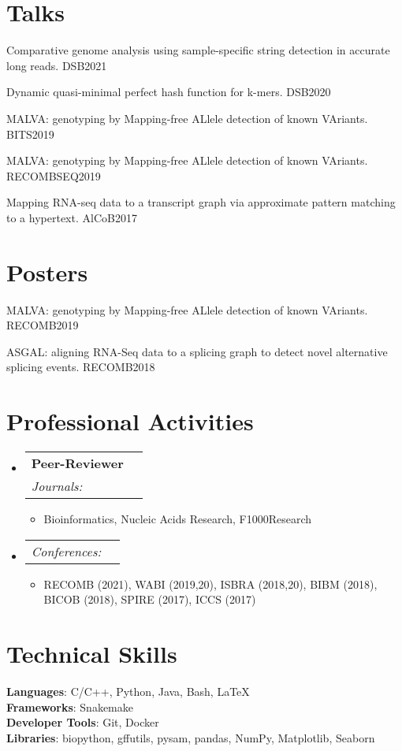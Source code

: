 \documentclass[letterpaper,11pt]{article}
\makeatletter
\newcommand{\resumeItem}[1]{
  \item\small{
    {#1 \vspace{-2pt}}
  }
}
\newcommand{\resumeSubheading}[4]{
  \vspace{-2pt}\item
    \begin{tabular*}{0.97\textwidth}[t]{l@{\extracolsep{\fill}}r}
      \textbf{#1} & #2 \\
      \textit{\small#3} & \textit{\small #4} \\
    \end{tabular*}\vspace{-7pt}
}
\newcommand{\resumeSubSubheading}[2]{
    \item
    \begin{tabular*}{0.97\textwidth}{l@{\extracolsep{\fill}}r}
      \textit{\small#1} & \textit{\small #2} \\
    \end{tabular*}\vspace{-7pt}
}
\newcommand{\resumeSubHeadingListStart}{\begin{itemize}[leftmargin=0.15in, label={}]}
\newcommand{\resumeSubHeadingListEnd}{\end{itemize}}
\newcommand{\resumeItemListStart}{\begin{itemize}}
\newcommand{\resumeItemListEnd}{\end{itemize}\vspace{-5pt}}
\makeatother
\begin{document}
\section{Talks}
{\small
\begin{etaremune}
    \item Comparative genome analysis using sample-specific string detection in accurate long reads. DSB2021
    \item Dynamic quasi-minimal perfect hash function for k-mers. DSB2020
    \item MALVA: genotyping by Mapping-free ALlele detection of known VAriants. BITS2019
    \item MALVA: genotyping by Mapping-free ALlele detection of known VAriants. RECOMBSEQ2019
    \item Mapping RNA-seq data to a transcript graph via approximate pattern matching to a hypertext. AlCoB2017
\end{etaremune}
}

\section{Posters}
{\small
\begin{etaremune}
    \item MALVA: genotyping by Mapping-free ALlele detection of known VAriants. RECOMB2019
    \item ASGAL: aligning RNA-Seq data to a splicing graph to detect novel alternative splicing events. RECOMB2018
\end{etaremune}
}

\section{Professional Activities}
\resumeSubHeadingListStart
    \resumeSubheading
      {Peer-Reviewer}{}
      {Journals:}{}
      \resumeItemListStart
        \resumeItem{Bioinformatics, Nucleic Acids Research, F1000Research}
      \resumeItemListEnd
    \resumeSubSubheading
      {Conferences:}{}
      \resumeItemListStart
        \resumeItem{RECOMB (2021), WABI (2019,20), ISBRA (2018,20), BIBM (2018), BICOB (2018), SPIRE (2017), ICCS (2017)}
      \resumeItemListEnd      
\resumeSubHeadingListEnd


\section{Technical Skills}
 \begin{itemize}[leftmargin=0.15in, label={}]
    \small{\item{
     \textbf{Languages}{: C/C++, Python, Java, Bash, \LaTeX} \\
     \textbf{Frameworks}{: Snakemake} \\
     \textbf{Developer Tools}{: Git, Docker} \\
     \textbf{Libraries}{: biopython, gffutils, pysam, pandas, NumPy, Matplotlib, Seaborn}
    }}
 \end{itemize}
\end{document}
